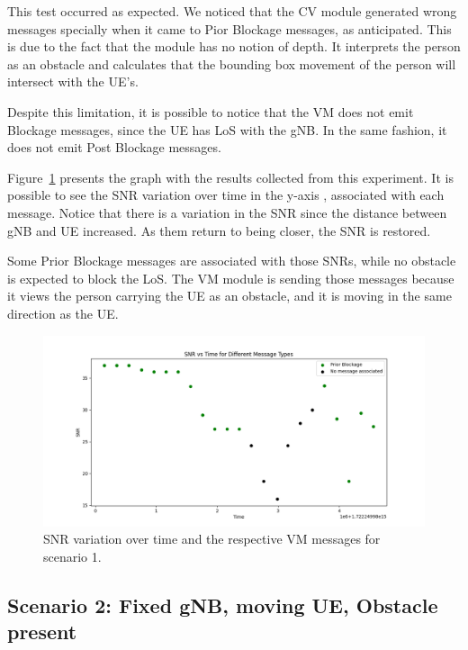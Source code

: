 This test occurred as expected.
We noticed that the CV module generated wrong messages specially when it came to Pior Blockage messages, as anticipated.
This is due to the fact that the module has no notion of depth.
It interprets the person as an obstacle and calculates that the bounding box movement of the person will intersect with the UE's.

Despite this limitation, it is possible to notice that the VM does not emit Blockage messages, since the UE has LoS with the gNB\@.
In the same fashion, it does not emit Post Blockage messages.

Figure~\ref{fig:results_1} presents the graph with the results collected from this experiment.
It is possible to see the SNR variation over time in the y-axis , associated with each message.
Notice that there is a variation in the SNR since the distance between gNB and UE increased.
As them return to being closer, the SNR is restored.

Some Prior Blockage messages are associated with those SNRs, while no obstacle is expected to block the LoS\@.
The VM module is sending those messages because it views the person carrying the UE as an obstacle, and it is moving in the same direction as the UE\@.


\begin{figure}[H]
    \centering
    \includegraphics[width=\linewidth]{figures/results_1}
    \caption{SNR variation over time and the respective VM messages for scenario 1.}
    \label{fig:results_1}
\end{figure}

\subsection{Scenario 2: Fixed gNB, moving UE, Obstacle present}\label{subsec:scenario-0.1:-fixed-gnb-moving-ue-obstacle-present}

